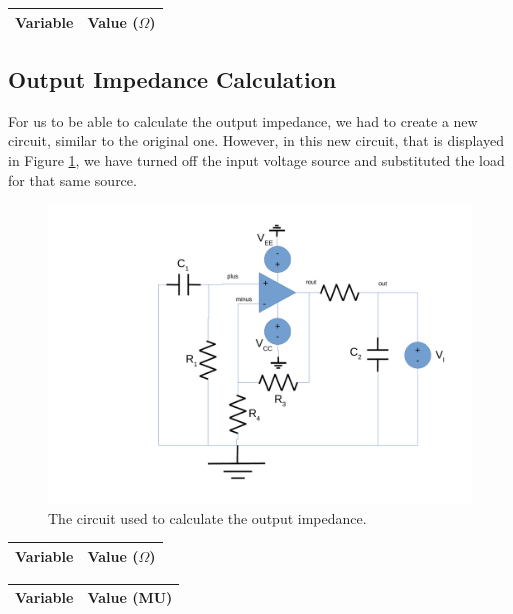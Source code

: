\begin{center}
\begin{tabular}{|l|r|}
  \hline    
  {\bf Variable} & {\bf Value ($\Omega$)} \\ \hline
  
\end{tabular}
\end{center}

\subsection{Output Impedance Calculation}

For us to be able to calculate the output impedance, we had to create a new circuit, similar to the original one. However, in this new circuit, that is displayed in Figure \ref{fig:circuit-out}, we have turned off the input voltage source and substituted the load for that same source.

\begin{figure}[H] \centering
\includegraphics[width=0.6\linewidth]{circuit-out.pdf}
\caption{The circuit used to calculate the output impedance.}
\label{fig:circuit-out}
\end{figure}

\begin{center}
\begin{tabular}{|l|r|}
  \hline    
  {\bf Variable} & {\bf Value ($\Omega$)} \\ \hline
  
\end{tabular}
\end{center}

\begin{center}
\begin{tabular}{|l|r|}
  \hline    
  {\bf Variable} & {\bf Value (MU)} \\ \hline
  
\end{tabular}
\end{center}

